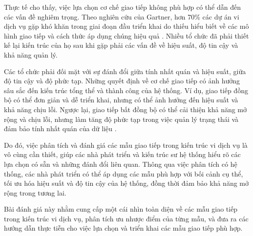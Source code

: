 Thực tế cho thấy, việc lựa chọn cơ chế giao tiếp không phù hợp có thể dẫn đến
các vấn đề nghiêm trọng. Theo nghiên cứu của Gartner, hơn 70\% các dự án
vi dịch vụ gặp khó khăn trong giai đoạn đầu triển khai do thiếu hiểu biết về
các mô hình giao tiếp và cách thức áp dụng chúng hiệu quả \cite{gartner2019}. Nhiều tổ chức đã
phải thiết kế lại kiến trúc của họ sau khi gặp phải các vấn đề về hiệu suất, độ
tin cậy và khả năng quản lý.

Các tổ chức phải đối mặt với sự đánh đổi giữa tính nhất quán và hiệu suất, giữa
độ tin cậy và độ phức tạp. Những quyết định về cơ chế giao tiếp có ảnh hưởng
sâu sắc đến kiến trúc tổng thể và thành công của hệ thống. Ví dụ, giao tiếp
đồng bộ có thể đơn giản và dễ triển khai, nhưng có thể ảnh hưởng đến hiệu suất
và khả năng chịu lỗi. Ngược lại, giao tiếp bất đồng bộ có thể cải thiện khả
năng mở rộng và chịu lỗi, nhưng làm tăng độ phức tạp trong việc quản lý trạng
thái và đảm bảo tính nhất quán của dữ liệu \cite{newman2015}.

Do đó, việc phân tích và đánh giá các mẫu giao tiếp
trong kiến trúc vi dịch vụ là vô cùng cần thiết, giúp các nhà phát triển và
kiến trúc sư hệ thống hiểu rõ các lựa chọn có sẵn và những đánh đổi liên quan.
Thông qua việc phân tích có hệ thống, các nhà phát triển có thể áp dụng các mẫu
phù hợp với bối cảnh cụ thể, tối ưu hóa hiệu suất và độ tin cậy của hệ thống,
đồng thời đảm bảo khả năng mở rộng trong tương lai.

Bài đánh giá này nhằm cung cấp một cái nhìn toàn diện về các mẫu giao tiếp
trong kiến trúc vi dịch vụ, phân tích ưu nhược điểm của từng mẫu, và đưa ra
các hướng dẫn thực tiễn cho việc lựa chọn và triển khai các mẫu giao tiếp phù
hợp.
